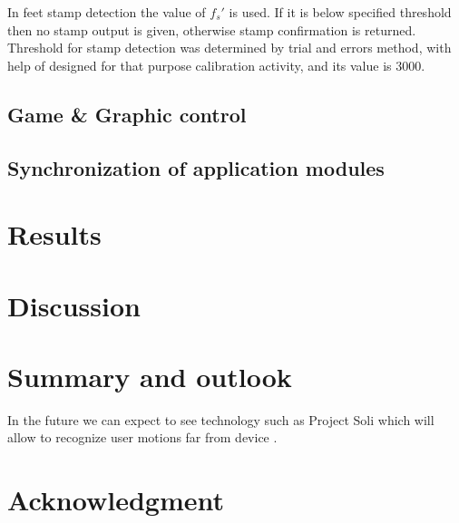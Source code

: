 \documentclass[conference]{IEEEtran}
\begin{document}
In feet stamp detection the value of $f_s'$ is used. If it is below specified threshold then no stamp output is given, otherwise stamp confirmation is returned. Threshold for stamp detection was determined by trial and errors method, with help of designed for that purpose calibration activity, and its value is $3000$.


\subsection{Game \& Graphic control}

\subsection{Synchronization of application modules}

\section{Results}

\section{Discussion}
 
\section{Summary and outlook}
In the future we can expect to see technology such as Project Soli which will allow to recognize user motions far from device \cite{ProjectSoli}.




\section*{Acknowledgment}
\end{document}
